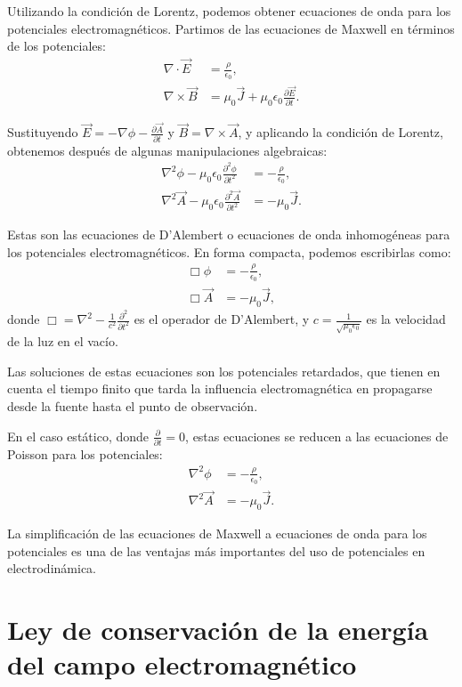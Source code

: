 \documentclass[12pt,a4paper]{book}
\begin{document}
Utilizando la condición de Lorentz, podemos obtener ecuaciones de onda para los potenciales electromagnéticos. Partimos de las ecuaciones de Maxwell en términos de los potenciales:
\begin{align}
\nabla \cdot \vec{E} &= \frac{\rho}{\epsilon_0}, \\
\nabla \times \vec{B} &= \mu_0 \vec{J} + \mu_0 \epsilon_0 \frac{\partial \vec{E}}{\partial t}.
\end{align}

Sustituyendo $\vec{E} = -\nabla \phi - \frac{\partial \vec{A}}{\partial t}$ y $\vec{B} = \nabla \times \vec{A}$, y aplicando la condición de Lorentz, obtenemos después de algunas manipulaciones algebraicas:
\begin{align}
\nabla^2 \phi - \mu_0 \epsilon_0 \frac{\partial^2 \phi}{\partial t^2} &= -\frac{\rho}{\epsilon_0}, \\
\nabla^2 \vec{A} - \mu_0 \epsilon_0 \frac{\partial^2 \vec{A}}{\partial t^2} &= -\mu_0 \vec{J}.
\end{align}

Estas son las ecuaciones de D'Alembert o ecuaciones de onda inhomogéneas para los potenciales electromagnéticos. En forma compacta, podemos escribirlas como:
\begin{align}
\Box \phi &= -\frac{\rho}{\epsilon_0}, \\
\Box \vec{A} &= -\mu_0 \vec{J},
\end{align}
donde $\Box = \nabla^2 - \frac{1}{c^2}\frac{\partial^2}{\partial t^2}$ es el operador de D'Alembert, y $c = \frac{1}{\sqrt{\mu_0 \epsilon_0}}$ es la velocidad de la luz en el vacío.

Las soluciones de estas ecuaciones son los potenciales retardados, que tienen en cuenta el tiempo finito que tarda la influencia electromagnética en propagarse desde la fuente hasta el punto de observación.

En el caso estático, donde $\frac{\partial}{\partial t} = 0$, estas ecuaciones se reducen a las ecuaciones de Poisson para los potenciales:
\begin{align}
\nabla^2 \phi &= -\frac{\rho}{\epsilon_0}, \\
\nabla^2 \vec{A} &= -\mu_0 \vec{J}.
\end{align}

La simplificación de las ecuaciones de Maxwell a ecuaciones de onda para los potenciales es una de las ventajas más importantes del uso de potenciales en electrodinámica.

\section{Ley de conservación de la energía del campo electromagnético}
\end{document}
